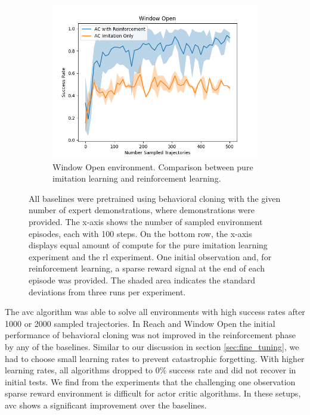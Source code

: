 \begin{figure}[htbp]
\begin{subfigure}[t]{0.45\textwidth}
      \includegraphics[width=\textwidth]{images/1_2000_imi/Window Open.png}
      \caption{Window Open environment. Comparison between pure imitation learning and reinforcement learning.}
    \end{subfigure}
    \caption{
    All baselines were pretrained using behavioral cloning with the given number of expert demonstrations, where demonstrations were provided. 
    The x-axis shows the number of sampled environment episodes, each with 100 steps. On the bottom row, 
    the x-axis displays equal amount of compute for the pure imitation learning experiment and the \ac{rl} experiment. 
    One initial observation and, for reinforcement learning, a sparse reward signal at the end of each episode was provided. 
    The shaded area indicates the standard deviations from three runs per experiment.}
    \label{fig:guided_ref}
\end{figure}

The \ac{avc} algorithm was able to solve all environments with high success rates after 1000 or 2000 sampled trajectories. In Reach and Window Open the initial performance
of behavioral cloning was not improved in the reinforcement phase by any of the baselines. Similar to our discussion in section \ref{sec:fine_tuning},
we had to choose small learning rates to prevent catastrophic forgetting. With higher learning rates, all algorithms dropped to $0 \%$ success rate and did
not recover in initial tests. We find from the experiments that the challenging one observation sparse reward environment is difficult for
actor critic algorithms. In these setups, \ac{avc} shows a significant improvement over the baselines.\\

